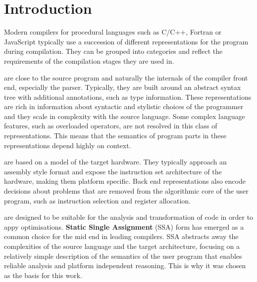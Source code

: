 
\pagebreak
\section{Introduction}

    Modern compilers for procedural languages such as
    C/C++, Fortran or JavaScript typically use a succession of different
    representations for the program during compilation.
    They can be grouped into categories and reflect the requirements of
    the compilation stages they are used in.

    \begin{description}[style=unboxed,leftmargin=0cm,labelindent=\parindent]
    \item[Front end representations] are close to the source program and
    naturally the internals of the compiler front end, especially the parser.
    Typically, they are built around an abstract syntax tree with
    additional annotations, such as type information.
    These representations are rich in information about syntactic and stylistic
    choices of the programmer and they scale in complexity with the source
    language.
    Some complex language features, such as overloaded operators, are not
    resolved in this class of representations.
    This means that the semantics of program parts in these representations
    depend highly on context.

    \item[\bf Back end representations] are based on a model of the target hardware.
    They typically approach an assembly style format and expose the instruction
    set architecture of the hardware, making them platform specific.
    Back end representations also encode decisions about problems that are
    removed from the algorithmic core of the user program, such as instruction
    selection and register allocation.

    \item[\bf Mid end representations] are designed to be suitable for the analysis
    and transformation of code in order to appy optimisations.
    {\bf Static Single Assignment} (SSA) form has emerged as a common choice for
    the mid end in leading compilers.
    SSA abstracts away the complexities of the source language and the
    target architecture, focusing on a relatively simple description of the
    semantics of the user program that enables reliable analysis and platform
    independent reasoning.
    This is why it was chosen as the basis for this work.
    \end{description}

